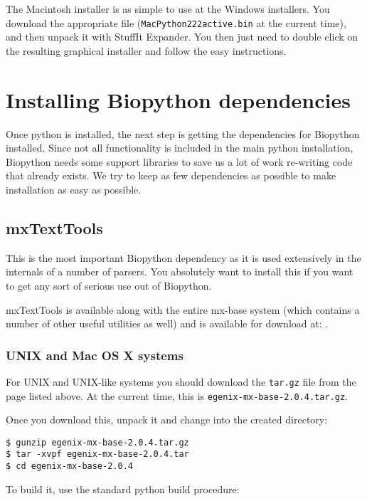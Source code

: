 \documentclass{article}
\begin{document}
The Macintosh installer is as simple to use at the Windows installers.
You download the appropriate file (\verb|MacPython222active.bin| at the
current time), and then unpack it with StuffIt Expander. You then just
need to double click on the resulting graphical installer and follow the
easy instructions.

\section{Installing Biopython dependencies}

Once python is installed, the next step is getting the dependencies
for Biopython installed. Since not all functionality is included in the
main python installation, Biopython needs some support libraries to save
us a lot of work re-writing code that already exists. We try to keep
as few dependencies as possible to make installation as easy as
possible.

\subsection{mxTextTools}

This is the most important Biopython dependency as it is used
extensively in the internals of a number of parsers. You absolutely want
to install this if you want to get any sort of serious use out of
Biopython.


mxTextTools is available along with the entire mx-base system (which
contains a number of other useful utilities as well) and is available
for download at:
. 

\subsubsection{UNIX and Mac OS X systems}

For UNIX and UNIX-like systems you should download the \verb|tar.gz|
file from the page listed above. At the current time, this is
\verb|egenix-mx-base-2.0.4.tar.gz|.

Once you download this, unpack it and change into the created directory:

\begin{verbatim}
$ gunzip egenix-mx-base-2.0.4.tar.gz 
$ tar -xvpf egenix-mx-base-2.0.4.tar
$ cd egenix-mx-base-2.0.4
\end{verbatim}

To build it, use the standard python build procedure:
\end{document}
